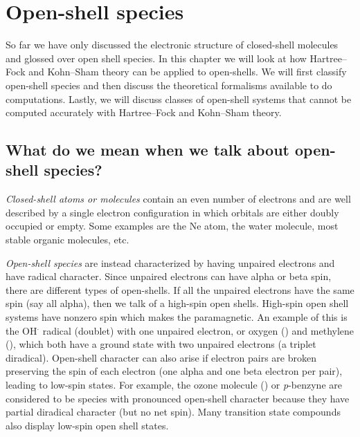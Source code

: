 \documentclass[../Main/notes.tex]{subfiles}
\begin{document}
\chapter{Open-shell species}



So far we have only discussed the electronic structure of closed-shell molecules and glossed over open shell species.
In this chapter we will look at how Hartree--Fock and Kohn--Sham theory can be applied to open-shells.
We will first classify open-shell species and then discuss the theoretical formalisms available to do computations.
Lastly, we will discuss classes of open-shell systems that cannot be computed accurately with Hartree--Fock and Kohn--Sham theory.

\section{What do we mean when we talk about open-shell species?}

\emph{Closed-shell atoms or molecules} contain an even number of electrons and are well described by a single electron configuration in which orbitals are either doubly occupied or empty.
Some examples are the Ne atom, the water molecule, most stable organic molecules, etc.

\emph{Open-shell species} are instead characterized by having unpaired electrons and have radical character.
Since unpaired electrons can have alpha or beta spin, there are different types of open-shells.
If all the unpaired electrons have the same spin (say all alpha), then we talk of a high-spin open shells.
High-spin open shell systems have nonzero spin which makes the paramagnetic.
An example of this is the OH$^\cdot$ radical (doublet) with one unpaired electron, or oxygen () and methylene (), which both have a ground state with two unpaired electrons (a triplet diradical).
Open-shell character can also arise if electron pairs are broken preserving the spin of each electron (one alpha and one beta electron per pair), leading to low-spin states.
For example, the ozone molecule () or \textit{p}-benzyne are considered to be species with pronounced open-shell character because they have partial diradical character (but no net spin).
Many transition state compounds also display low-spin open shell states.
\end{document}
